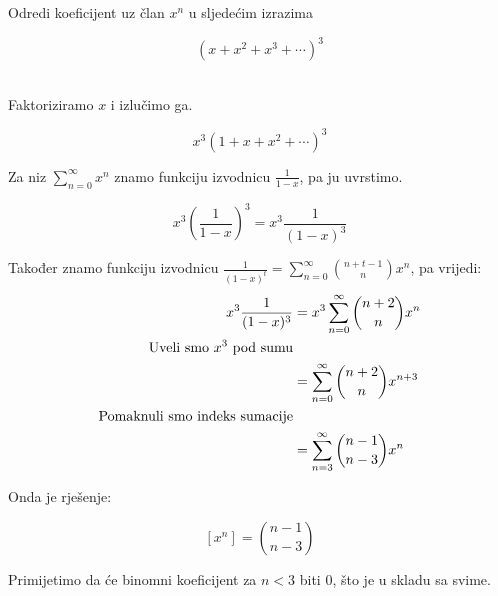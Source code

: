 \documentclass[exam.tex]{subfiles}
\begin{document}
	\begin{subtask}
		Odredi koeficijent uz član \( x^n \) u sljedećim izrazima
	
		\[ (x + x^2 + x^3 + \cdots)^3 \] \\
	\end{subtask}
	
	Faktoriziramo \( x \) i izlučimo ga.
	
	\[ x^3 (1 + x + x^2 + \cdots)^3 \]
	
	Za niz \( \sum\limits^\infty_{n=0} x^n \) znamo funkciju izvodnicu \( \frac{1}{1 - x} \), pa ju uvrstimo.
	
	\[ x^3 \left ( \frac{1}{1 - x} \right )^3 = x^3 \frac{1}{(1 - x)^3} \]
	
	Također znamo funkciju izvodnicu \( \frac{1}{(1 - x)^t} = \sum\limits^\infty_{n=0} \binom{n + t - 1}{n} x^n \), pa vrijedi:
	\begin{align*}
		x^3 \frac{1}{(1 - x)^3} &= x^3 \sum\limits^\infty_{n=0} \binom{n + 2}{n} x^n \\
		\text{Uveli smo \( x^3 \) pod sumu} \\
		&= \sum\limits^\infty_{n=0} \binom{n + 2}{n} x^{n + 3} \\
		\text{Pomaknuli smo indeks sumacije} \\
		&= \sum\limits^\infty_{n=3} \binom{n - 1}{n - 3} x^n
	\end{align*}
	
	Onda je rješenje:
	
	\[ [x^n] = \binom{n - 1}{n - 3} \]
	
	Primijetimo da će binomni koeficijent za \( n < 3 \) biti 0, što je u skladu sa svime.
\end{document}
